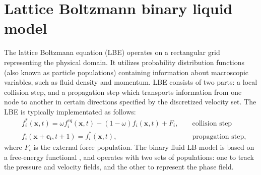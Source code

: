 \documentclass{article}
\begin{document}
\section{Lattice Boltzmann binary liquid model}
The lattice Boltzmann equation (LBE) operates on a rectangular grid representing the
physical domain. It utilizes
probability distribution functions (also known as particle populations)
containing information about
macroscopic variables, such as fluid density and momentum. LBE consists of
two parts: a local collision step, and a propagation step which transports
information from one node to another in certain
directions specified by the discretized velocity set.
The LBE is typically implementated as follows:
\begin{equation}
\label{standard:implementation}
\begin{aligned}
&f_i^{*}(\bm{x},t)=\omega f_i^{eq}(\bm{x},t)-(1-\omega) f_i(\bm{x},t) +
F_i,&&\text{ collision step}\\
&f_i(\bm{x}+\bm{c_i},t+1)=f_i^{*}(\bm{x},t),&&\text{ propagation step}, 
\end{aligned}
\end{equation}
where $F_i$ is the external force population. The binary fluid LB model is
based on a free-energy functional \cite{swift,landau}, and operates with two
sets of populations: one to track the pressure and velocity fields, and the
other to represent the phase field.
\end{document}
